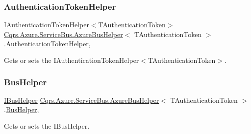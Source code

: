 \subsubsection{\texorpdfstring{Authentication\+Token\+Helper}{AuthenticationTokenHelper}}
{\footnotesize\ttfamily \hyperlink{interfaceCqrs_1_1Authentication_1_1IAuthenticationTokenHelper}{I\+Authentication\+Token\+Helper}$<$T\+Authentication\+Token$>$ \hyperlink{classCqrs_1_1Azure_1_1ServiceBus_1_1AzureBusHelper}{Cqrs.\+Azure.\+Service\+Bus.\+Azure\+Bus\+Helper}$<$ T\+Authentication\+Token $>$.\hyperlink{classCqrs_1_1Authentication_1_1AuthenticationTokenHelper}{Authentication\+Token\+Helper}\hspace{0.3cm}{\ttfamily [get]}, {\ttfamily [protected]}}



Gets or sets the I\+Authentication\+Token\+Helper$<$\+T\+Authentication\+Token$>$. 

\mbox{\label{classCqrs_1_1Azure_1_1ServiceBus_1_1AzureBusHelper_a1a827b64ae73d8c368852e77dc94a2b1_a1a827b64ae73d8c368852e77dc94a2b1}} 
\subsubsection{\texorpdfstring{Bus\+Helper}{BusHelper}}
{\footnotesize\ttfamily \hyperlink{interfaceCqrs_1_1Bus_1_1IBusHelper}{I\+Bus\+Helper} \hyperlink{classCqrs_1_1Azure_1_1ServiceBus_1_1AzureBusHelper}{Cqrs.\+Azure.\+Service\+Bus.\+Azure\+Bus\+Helper}$<$ T\+Authentication\+Token $>$.\hyperlink{classCqrs_1_1Bus_1_1BusHelper}{Bus\+Helper}\hspace{0.3cm}{\ttfamily [get]}, {\ttfamily [protected]}}



Gets or sets the I\+Bus\+Helper. 

\mbox{\label{classCqrs_1_1Azure_1_1ServiceBus_1_1AzureBusHelper_aae005b5dd2d891bfe8e959c6360ff5a4_aae005b5dd2d891bfe8e959c6360ff5a4}} 
